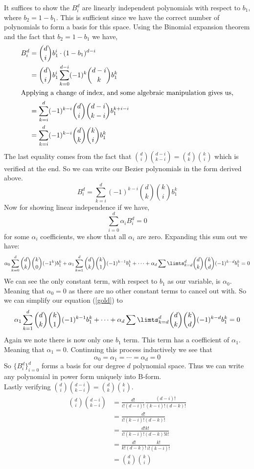 \documentclass[11pt]{article}
\begin{document}
It suffices to show the $B_i^d$ are linearly independent polynomials with respect to $b_1$, where $b_2 = 1-b_1$. This is sufficient since we have the correct number of polynomials to form a basis for this space. Using the Binomial expansion theorem and the fact that $b_2 = 1-b_1$ we have,
\begin{align*}
    B_i^d &= {d \choose i}b_1^i \cdot (1-b_1)^{d-i}\\
          &= {d \choose i}b_1^i \sum \limits_{k=0}^{d-i}(-1)^k {{d-i}\choose{k}} b_1^k \\
          \intertext{Applying a change of index, and some algebraic manipulation gives us,}
          &= \sum \limits_{k=i}^{d} (-1)^{k-i} {d \choose i} {{d-i} \choose {k-i}}b_1^{k+i-i}\\
          &= \sum \limits_{k=i}^{d}(-1)^{k-i} {d \choose k} {k \choose i} b_1^k
\end{align*}
The last equality comes from the fact that ${d\choose i}{{d-i}\choose {k-i}} = {d \choose k}{k \choose i}$ which is verified at the end. So we can write our Bezier polynomials in the form derived above. 
\[B_i^d= \sum \limits_{k=i}^{d}(-1)^{k-i} {d \choose k} {k \choose i} b_1^k\]
Now for showing linear independence if we have, 
\[\sum \limits_{i=0}^d \alpha_i B^d_i =0 \]
for some $\alpha_i$ coefficients, we show that all $\alpha_i$ are zero. Expanding this sum out we have:
\begin{equation}
    \alpha_0 \sum_{k=0}^d {d\choose k}{k \choose 0}(-1^k)b_1^k + \alpha_1 \sum_{k=1}^d {d\choose k}{k \choose 1}(-1)^{k-1}b_1^k + \cdots + \alpha_d \sum \limts_{k=d}^d {d \choose k} {k \choose d} (-1)^{k-d}b_1^k = 0
    \label{gold}
\end{equation}
 We can see the only constant term, with respect to $b_1$ as our variable, is $\alpha_0$. Meaning that $\alpha_0 = 0$ as there are no other constant terms to cancel out with. So we can simplify our equation (\ref{gold}) to 
\[\alpha_1 \sum_{k=1}^d {d\choose k}{k \choose 1}(-1)^{k-1}b_1^k + \cdots + \alpha_d \sum \limts_{k=d}^d {d \choose k} {k \choose d} (-1)^{k-d}b_1^k = 0\]
Again we note there is now only one $b_1$ term. This term has a coefficient of $\alpha_1$. Meaning that $\alpha_1 = 0$. Continuing this process inductively we see that 
\[\alpha_0 = \alpha_1 = \cdots = \alpha_d = 0\]
So $\{B^d_i\}_{i=0}^d$ forms a basis for our degree $d$ polynomial space. Thus we can write any polynomial in power form  uniquely into B-form.\\

Lastly verifying ${d\choose i}{{d-i}\choose {k-i}} = {d \choose k}{k \choose i}$. 
\begin{align*}
    {d\choose i}{{d-i}\choose {k-i}} &= \frac{d!}{i! (d-i)!}\frac{(d-i)!}{(k-i)!(d-k)!}\\
    &=\frac{d!}{i!(k-i)!(d-k)!}\\
    &=\frac{d!k!}{i!(k-i)!(d-k)!k!}\\
    &=\frac{d!}{k!(d-k)!}\frac{k!}{i!(k-i)!}\\
    &={d \choose k}{k \choose i}
\end{align*}
\end{document}

